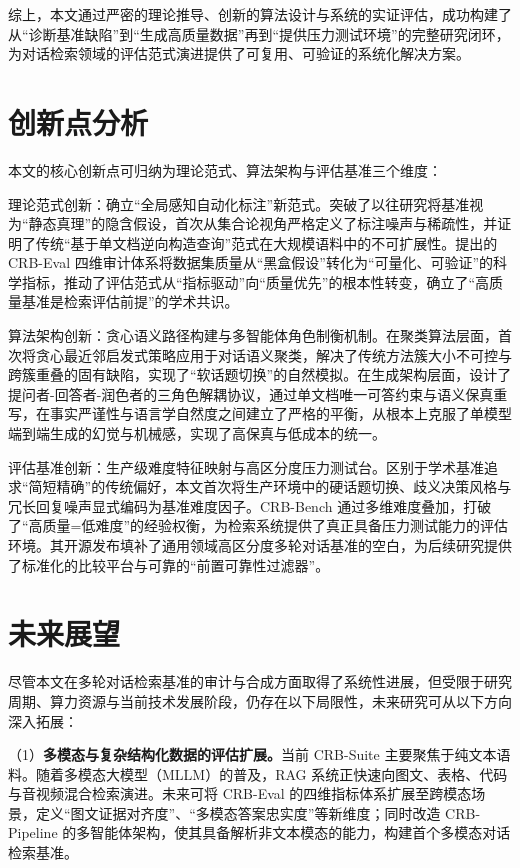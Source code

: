 综上，本文通过严密的理论推导、创新的算法设计与系统的实证评估，成功构建了从“诊断基准缺陷”到“生成高质量数据”再到“提供压力测试环境”的完整研究闭环，为对话检索领域的评估范式演进提供了可复用、可验证的系统化解决方案。

\section{创新点分析}
\label{sec:contributions}

本文的核心创新点可归纳为理论范式、算法架构与评估基准三个维度：

理论范式创新：确立“全局感知自动化标注”新范式。突破了以往研究将基准视为“静态真理”的隐含假设，首次从集合论视角严格定义了标注噪声与稀疏性，并证明了传统“基于单文档逆向构造查询”范式在大规模语料中的不可扩展性。提出的 CRB-Eval 四维审计体系将数据集质量从“黑盒假设”转化为“可量化、可验证”的科学指标，推动了评估范式从“指标驱动”向“质量优先”的根本性转变，确立了“高质量基准是检索评估前提”的学术共识。

算法架构创新：贪心语义路径构建与多智能体角色制衡机制。在聚类算法层面，首次将贪心最近邻启发式策略应用于对话语义聚类，解决了传统方法簇大小不可控与跨簇重叠的固有缺陷，实现了“软话题切换”的自然模拟。在生成架构层面，设计了提问者-回答者-润色者的三角色解耦协议，通过单文档唯一可答约束与语义保真重写，在事实严谨性与语言学自然度之间建立了严格的平衡，从根本上克服了单模型端到端生成的幻觉与机械感，实现了高保真与低成本的统一。

评估基准创新：生产级难度特征映射与高区分度压力测试台。区别于学术基准追求“简短精确”的传统偏好，本文首次将生产环境中的硬话题切换、歧义决策风格与冗长回复噪声显式编码为基准难度因子。CRB-Bench 通过多维难度叠加，打破了“高质量=低难度”的经验权衡，为检索系统提供了真正具备压力测试能力的评估环境。其开源发布填补了通用领域高区分度多轮对话基准的空白，为后续研究提供了标准化的比较平台与可靠的“前置可靠性过滤器”。

\section{未来展望}
\label{sec:future_work}

尽管本文在多轮对话检索基准的审计与合成方面取得了系统性进展，但受限于研究周期、算力资源与当前技术发展阶段，仍存在以下局限性，未来研究可从以下方向深入拓展：

（1）\textbf{多模态与复杂结构化数据的评估扩展。}当前 CRB-Suite 主要聚焦于纯文本语料。随着多模态大模型（MLLM）的普及，RAG 系统正快速向图文、表格、代码与音视频混合检索演进。未来可将 CRB-Eval 的四维指标体系扩展至跨模态场景，定义“图文证据对齐度”、“多模态答案忠实度”等新维度；同时改造 CRB-Pipeline 的多智能体架构，使其具备解析非文本模态的能力，构建首个多模态对话检索基准。
    
